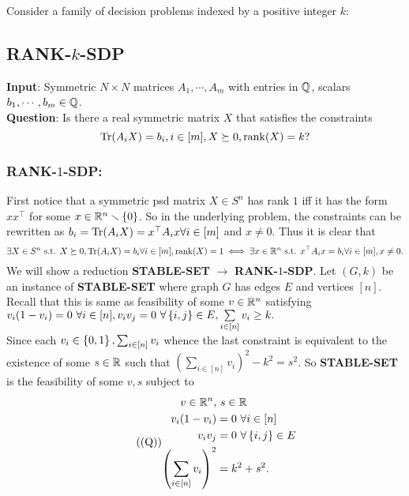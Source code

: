 Consider a family of decision problems indexed by a positive integer $k$:
\subsection*{RANK-$k$-SDP}
\textbf{Input}: Symmetric $N\times N$ matrices $A_{1},\cdots,A_{m}$ with entries in $\mathbb{Q}$, scalars $b_{1},\cdots,b_{m} \in\mathbb{Q}$. \\
\textbf{Question}: Is there a real symmetric matrix $X$ that satisfies the constraints
\begin{equation}\label{rk1}\operatorname{Tr}(A_{i}X) = b_{i},i \in[m], X \succeq 0, \operatorname{rank}(X) = k?\end{equation}

\soln

\subsubsection*{RANK-$1$-SDP:}
First notice that a symmetric psd matrix $X\in S^{n}$ has rank $1$ iff it has the form $xx^{\top}$ for some $x\in \mathbb{R}^{n}\smallsetminus\left\{0\right\}$. So in the underlying problem, the constraints can be rewritten as $b_{i}=\operatorname{Tr}(A_{i}X) = x^{\top}A_{i}x\forall i\in[m]$ and $x\ne 0$. Thus it is clear that \begin{equation}\label{ee}\exists X\in S^{n} \text{ s.t. } X\succeq0,\operatorname{Tr}(A_{i}X) = b_{i}\forall i \in[m], \operatorname{rank}(X) =1\iff \exists x\in \mathbb{R}^{n} \text{ s.t. } x^{\top}A_{i}x = b_{i}\forall i\in[m], x\neq0.\end{equation}
We will show a reduction \textbf{STABLE-SET} $\longrightarrow$ \textbf{RANK-$1$-SDP}. Let $(G,k)$ be an instance of \textbf{STABLE-SET} where graph $G$ has edges $E$ and vertices $[n]$. Recall that this is same as feasibility of some $v\in \mathbb{R}^{n}$ satisfying $v_{i}(1-v_{i}) = 0~\forall i\in [n], v_{i}v_{j} = 0 ~\forall \left\{i,j\right\}\in E, \sum\limits_{i\in[n]} v_{i} \ge k.$\\
Since each $v_{i}\in \left\{0,1\right\}, \sum_{i\in[n]} v_{i}$ whence the last constraint is equivalent to the existence of some $s\in \mathbb{R}$ such that $\left(\sum\limits_{i\in[n]} v_{i}\right)^{2} - k^{2}=s^{2}$. So \textbf{STABLE-SET} is the feasibility of some $v,s$ subject to \begin{equation}\tag{(Q)}\label{Q}\begin{aligned}
v\in\mathbb{R}^{n}, &~s\in\mathbb{R}\\
v_{i}(1-v_{i}) &= 0~\forall i\in [n]\\
v_{i}v_{j} &= 0 ~\forall \left\{i,j\right\}\in E\\
\left(\sum_{i\in[n]} v_{i}\right)^{2}&=k^{2}+s^{2}.
\end{aligned}\end{equation}

